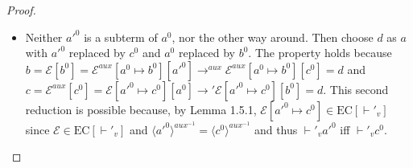 \begin{proof}
\begin{itemize}
\item Neither $a'^0$ is a subterm of $a^0$, nor the other way around. Then choose $d$ as $a$ with $a'^0$ replaced by $c^0$ and $a^0$ replaced by $b^0$. The property holds because $b = \mathcal{E}[b^0] = \mathcal{E}^{aux}[a^0 \mapsto b^0][a'^0] \longrightarrow^{aux} \mathcal{E}^{aux}[a^0 \mapsto b^0][c^0] = d$ and $c = \mathcal{E}^{aux}[c^0] = \mathcal{E}[a'^0 \mapsto c^0][a^0] \longrightarrow' \mathcal{E}[a'^0 \mapsto c^0][b^0] = d$. This second reduction is possible because, by Lemma 1.5.1, $\mathcal{E}[a'^0 \mapsto c^0] \in \textrm{EC}[\vdash'_v]$ since $\mathcal{E} \in \textrm{EC}[\vdash'_v]$ and $\langle a'^0 \rangle^{aux^{-1}} = \langle c^0 \rangle^{aux^{-1}}$ and thus $\vdash'_v a'^0$ iff $\vdash'_v c^0$.
\end{itemize}

\end{proof}

